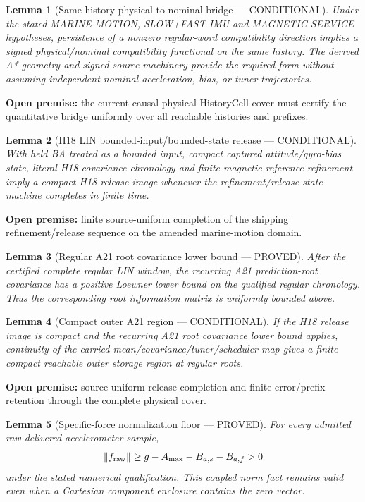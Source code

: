 \documentclass[journal]{IEEEtran}
\newtheorem{lemma}{Lemma}\newtheorem{theorem}{Theorem}\newtheorem{proposition}{Proposition}\newtheorem{remark}{Remark}\newtheorem{corollary}{Corollary}
\begin{document}
\begin{lemma}[Same-history physical-to-nominal bridge --- CONDITIONAL]
Under the stated MARINE MOTION, SLOW+FAST IMU and MAGNETIC SERVICE hypotheses, persistence of a nonzero regular-word compatibility direction implies a signed physical/nominal compatibility functional on the same history.  The derived A* geometry and signed-source machinery provide the required form without assuming independent nominal acceleration, bias, or tuner trajectories.
\end{lemma}
\noindent\textbf{Open premise:} the current causal physical HistoryCell cover must certify the quantitative bridge uniformly over all reachable histories and prefixes.

\begin{lemma}[H18 LIN bounded-input/bounded-state release --- CONDITIONAL]
With held BA treated as a bounded input, compact captured attitude/gyro-bias state, literal H18 covariance chronology and finite magnetic-reference refinement imply a compact H18 release image whenever the refinement/release state machine completes in finite time.
\end{lemma}
\noindent\textbf{Open premise:} finite source-uniform completion of the shipping refinement/release sequence on the amended marine-motion domain.

\begin{lemma}[Regular A21 root covariance lower bound --- PROVED]
After the certified complete regular LIN window, the recurring A21 prediction-root covariance has a positive Loewner lower bound on the qualified regular chronology.  Thus the corresponding root information matrix is uniformly bounded above.
\end{lemma}

\begin{lemma}[Compact outer A21 region --- CONDITIONAL]
If the H18 release image is compact and the recurring A21 root covariance lower bound applies, continuity of the carried mean/covariance/tuner/scheduler map gives a finite compact reachable outer storage region at regular roots.
\end{lemma}
\noindent\textbf{Open premise:} source-uniform release completion and finite-error/prefix retention through the complete physical cover.

\begin{lemma}[Specific-force normalization floor --- PROVED]
For every admitted raw delivered accelerometer sample,
\[
\left\lVert f_{\rm raw}\right\rVert\ge g-A_{\max}-B_{a,s}-B_{a,f}>0
\]
under the stated numerical qualification.  This coupled norm fact remains valid even when a Cartesian component enclosure contains the zero vector.
\end{lemma}
\end{document}
